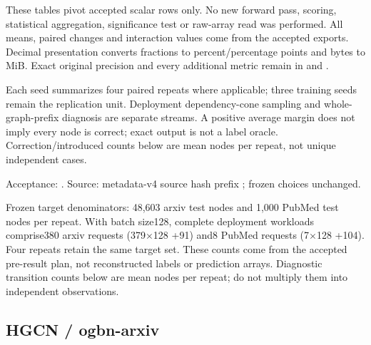 These tables pivot accepted scalar rows only. No new forward pass, scoring, statistical aggregation, significance test or raw-array read was performed. All means, paired changes and interaction values come from the accepted exports. Decimal presentation converts fractions to percent/percentage points and bytes to MiB. Exact original precision and every additional metric remain in  and .

Each seed summarizes four paired repeats where applicable; three training seeds remain the replication unit. Deployment dependency-cone sampling and whole-graph-prefix diagnosis are separate streams. A positive average margin does not imply every node is correct; exact output is not a label oracle. Correction/introduced counts below are mean nodes per repeat, not unique independent cases.

Acceptance: . Source: metadata-v4 source hash prefix ; frozen choices unchanged.

Frozen target denominators: 48,603 arxiv test nodes and 1,000 PubMed test nodes per repeat. With batch size128, complete deployment workloads comprise380 arxiv requests (379\ensuremath{\times}128 +91) and8 PubMed requests (7\ensuremath{\times}128 +104). Four repeats retain the same target set. These counts come from the accepted pre-result plan, not reconstructed labels or prediction arrays. Diagnostic transition counts below are mean nodes per repeat; do not multiply them into independent observations.

\subsection{HGCN / ogbn-arxiv}
